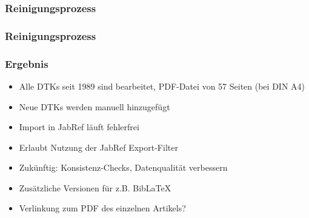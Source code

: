 \documentclass[ngerman]{beamer}
\begin{document}
\begin{frame}[fragile]
\frametitle{Reinigungsprozess}

\begin{center}
\end{center}

\end{frame}


\begin{frame}
\frametitle{Reinigungsprozess}



\end{frame}

\begin{frame}
\frametitle{Ergebnis}

\begin{itemize}
\item Alle DTKs seit 1989 sind bearbeitet, PDF-Datei von 57 Seiten (bei DIN A4)
\item Neue DTKs werden manuell hinzugefügt
\item Import in JabRef läuft fehlerfrei
\item Erlaubt Nutzung der JabRef Export-Filter
\item Zukünftig: Konsistenz-Checks, Datenqualität verbessern
\item Zusätzliche Versionen für z.B. Bib\LaTeX
\item Verlinkung zum PDF des einzelnen Artikels?
\end{itemize}
\end{frame}
\end{document}
